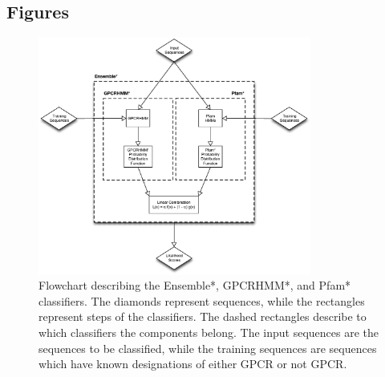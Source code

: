 \subsection{Figures}


\begin{figure}[H]
\centering
\includegraphics[width=0.8\textwidth]{figures/gpcr_classifier/ensemble-diagram.eps}
\caption{Flowchart describing the Ensemble*, GPCRHMM*, and Pfam* classifiers.  The diamonds represent sequences, while the rectangles represent steps of the classifiers.  The dashed rectangles describe to which classifiers the components belong. The input sequences are the sequences to be classified, while the training sequences are sequences which have known designations of either GPCR or not GPCR.}
\label{fig:ensemble-diagram}
\end{figure}

